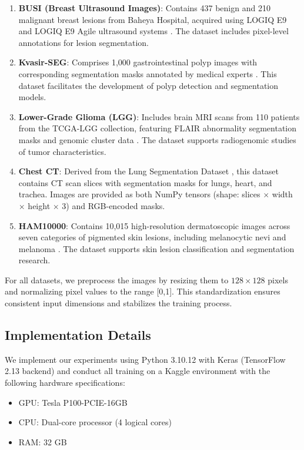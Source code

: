 \documentclass[review]{elsarticle}
\begin{document}
\begin{enumerate}
    \item \textbf{BUSI (Breast Ultrasound Images)}: Contains 437 benign and 210 malignant breast lesions from Baheya Hospital, acquired using LOGIQ E9 and LOGIQ E9 Agile ultrasound systems \cite{Walid2020}. The dataset includes pixel-level annotations for lesion segmentation.
    
    \item \textbf{Kvasir-SEG}: Comprises 1,000 gastrointestinal polyp images with corresponding segmentation masks annotated by medical experts \cite{Jha2020}. This dataset facilitates the development of polyp detection and segmentation models.
    
    \item \textbf{Lower-Grade Glioma (LGG)}: Includes brain MRI scans from 110 patients from the TCGA-LGG collection, featuring FLAIR abnormality segmentation masks and genomic cluster data \cite{BrainMRI_Data}. The dataset supports radiogenomic studies of tumor characteristics.
    
    \item \textbf{Chest CT}: Derived from the Lung Segmentation Dataset \cite{chest_CT}, this dataset contains CT scan slices with segmentation masks for lungs, heart, and trachea. Images are provided as both NumPy tensors (shape: slices $\times$ width $\times$ height $\times$ 3) and RGB-encoded masks.
    
    \item \textbf{HAM10000}: Contains 10,015 high-resolution dermatoscopic images across seven categories of pigmented skin lesions, including melanocytic nevi and melanoma \cite{Tschandl2018}. The dataset supports skin lesion classification and segmentation research.
\end{enumerate}

For all datasets, we preprocess the images by resizing them to $128 \times 128$ pixels and normalizing pixel values to the range [0,1]. This standardization ensures consistent input dimensions and stabilizes the training process.

\subsection{Implementation Details}
We implement our experiments using Python 3.10.12 with Keras (TensorFlow 2.13 backend) and conduct all training on a Kaggle environment with the following hardware specifications:
\begin{itemize}
    \item GPU: Tesla P100-PCIE-16GB
    \item CPU: Dual-core processor (4 logical cores)
    \item RAM: 32 GB
\end{itemize}
\end{document}
